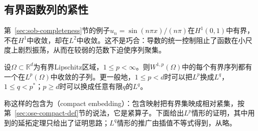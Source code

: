 \subsection{有界函数列的紧性}
\label{sec:sob-compactness}

第~\ref{sec:sob-completeness}节的例子$u_n=\sin(n\pi x)/(n\pi)$在$H^1(0,1)$中有界，不在$H^1$中收敛，却在$L^2$中收敛。这不是巧合：导数的统一控制阻止了函数在小尺度上剧烈振荡，从而在较弱的范数下迫使序列聚集。

\begin{theorem}[紧嵌入]
\label{thm:sob-rellich}
设$\Omega\subset\mathbb R^d$为有界Lipschitz区域，$1\le p<\infty$。则$W^{1,p}(\Omega)$中的每个有界序列都有一个在$L^p(\Omega)$中收敛的子列。更一般地，$1\le p<d$时可以把$L^p$换成$L^q$，$1\le q<p^*$；$p\ge d$时可以换成任意有限$q$的$L^q$。
\end{theorem}

称这样的包含为（compact embedding）：包含映射把有界集映成相对紧集，按第~\ref{sec:ose-compact-def}节的说法，它是紧算子。下面给出$L^p$情形的证明，其中用到的延拓定理只给出了证明思路；$L^q$情形的推广由插值不等式得到，从略。

